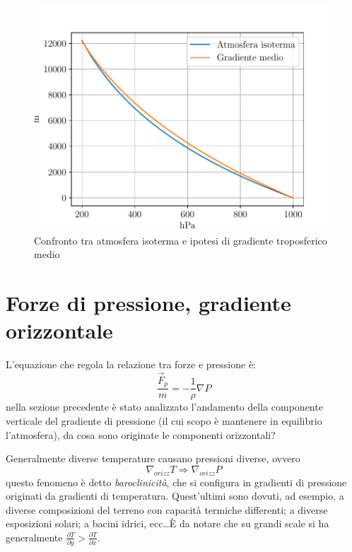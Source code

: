 \begin{figure}[h]     				\centering                                                                  
   \includegraphics[width=.65\textwidth]{figures/iso_vs_grad.pdf} 
	\caption{Confronto tra atmosfera isoterma e ipotesi di gradiente troposferico medio}          
   \label{fig:iso_vs_grad}
\end{figure}         
\section{Forze di pressione, gradiente orizzontale}
L'equazione che regola la relazione tra forze e pressione è:
\begin{equation}
	\frac{\vec{F}_p}{m}=-\frac{1}{\rho}\nabla P
\end{equation}
nella sezione precedente è stato analizzato l'andamento della componente verticale del gradiente di pressione (il cui scopo è mantenere in equilibrio l'atmosfera), da cosa sono originate le componenti orizzontali? 

Generalmente diverse temperature causano pressioni diverse, ovvero
\begin{equation*}
	\nabla_{orizz} T \Rightarrow \nabla_{orizz} P
\end{equation*}
questo fenomeno è detto \emph{baroclinicità}, che si configura in gradienti di pressione originati da gradienti di temperatura. Quest'ultimi sono dovuti, ad esempio, a diverse composizioni del terreno con capacità termiche differenti; a diverse esposizioni solari; a bacini idrici, ecc\ldots  È da notare che su grandi scale si ha generalmente $\frac{\partial T}{\partial y} > \frac{\partial T}{\partial x}$.